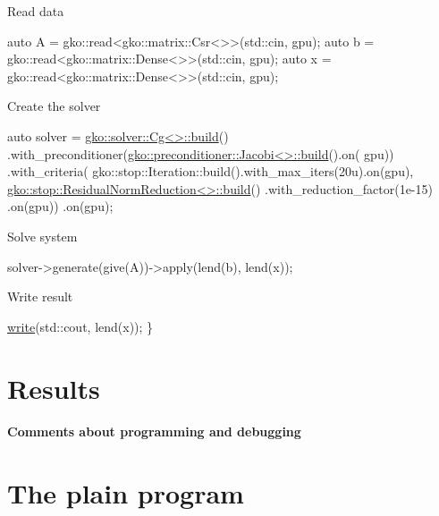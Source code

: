 Read data


\begin{DoxyCode}
\textcolor{keyword}{auto} A = gko::read<gko::matrix::Csr<>>(std::cin, gpu);
\textcolor{keyword}{auto} b = gko::read<gko::matrix::Dense<>>(std::cin, gpu);
\textcolor{keyword}{auto} x = gko::read<gko::matrix::Dense<>>(std::cin, gpu);
\end{DoxyCode}


Create the solver


\begin{DoxyCode}
\textcolor{keyword}{auto} solver =
    \hyperlink{classgko_1_1solver_1_1Cg}{gko::solver::Cg<>::build}()
        .with\_preconditioner(\hyperlink{classgko_1_1preconditioner_1_1Jacobi}{gko::preconditioner::Jacobi<>::build}().on(
      gpu))
        .with\_criteria(
            gko::stop::Iteration::build().with\_max\_iters(20u).on(gpu),
            \hyperlink{classgko_1_1stop_1_1ResidualNormReduction}{gko::stop::ResidualNormReduction<>::build}()
                .with\_reduction\_factor(1e-15)
                .on(gpu))
        .on(gpu);
\end{DoxyCode}


Solve system


\begin{DoxyCode}
solver->generate(give(A))->apply(lend(b), lend(x));
\end{DoxyCode}


Write result


\begin{DoxyCode}
    \hyperlink{namespacegko_a859dc47a462721d83728d91ab7fa2148}{write}(std::cout, lend(x));
\}
\end{DoxyCode}
 \label{_Results}%
\section*{Results}

\label{_Commentsaboutprogramminganddebugging}%
\paragraph*{Comments about programming and debugging }

\label{_PlainProg}%
 \section*{The plain program}



